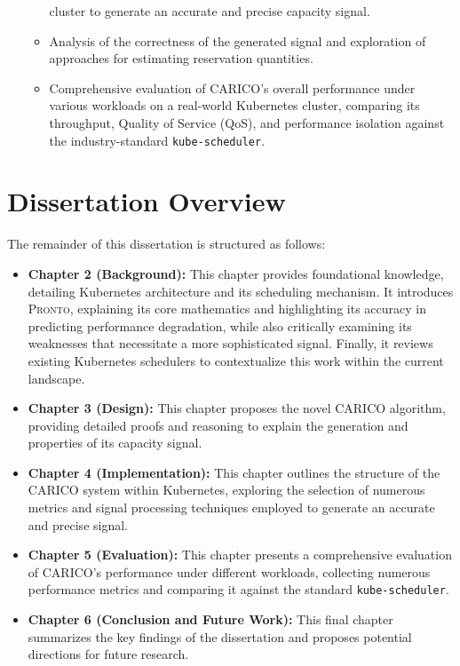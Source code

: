 \begin{itemize}
\begin{itemize}
            cluster to generate an accurate and precise capacity signal.
        \item Analysis of the correctness of the generated signal and
            exploration of approaches for estimating reservation quantities.
        \item Comprehensive evaluation of \textsc{CARICO}'s overall performance
            under various workloads on a real-world Kubernetes cluster,
            comparing its throughput, Quality of Service (QoS), and performance
            isolation against the industry-standard \texttt{kube-scheduler}.
    \end{itemize}
\end{itemize}

\section{Dissertation Overview}
The remainder of this dissertation is structured as follows:
\begin{itemize}
    \item \textbf{Chapter 2 (Background):} This chapter provides foundational
        knowledge, detailing Kubernetes architecture and its scheduling
        mechanism. It introduces \textsc{Pronto}, explaining its core
        mathematics and highlighting its accuracy in predicting performance
        degradation, while also critically examining its weaknesses that
        necessitate a more sophisticated signal. Finally, it reviews existing
        Kubernetes schedulers to contextualize this work within the current
        landscape.
    \item \textbf{Chapter 3 (Design):} This chapter proposes the novel
        \textsc{CARICO} algorithm, providing detailed proofs and reasoning to
        explain the generation and properties of its capacity signal.
    \item \textbf{Chapter 4 (Implementation):} This chapter outlines the
        structure of the \textsc{CARICO} system within Kubernetes, exploring the
        selection of numerous metrics and signal processing techniques employed
        to generate an accurate and precise signal.
    \item \textbf{Chapter 5 (Evaluation):} This chapter presents a comprehensive
        evaluation of \textsc{CARICO}'s performance under different workloads,
        collecting numerous performance metrics and comparing it against the
        standard \texttt{kube-scheduler}.
    \item \textbf{Chapter 6 (Conclusion and Future Work):} This final chapter
        summarizes the key findings of the dissertation and proposes potential
        directions for future research.
\end{itemize}
